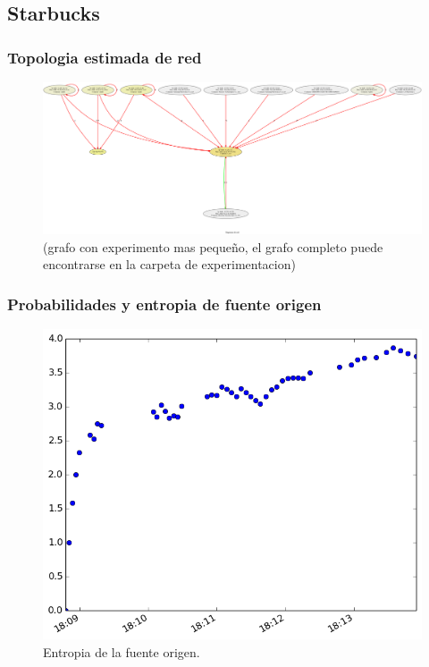 \subsection{Starbucks}
\subsubsection{Topologia estimada de red}
\begin{figure}[h!]
  \centering	
	\includegraphics[scale=0.15]{../experimentacion-svilerino/starbucks/graph-starbucks-3.png}
  \caption{(grafo con experimento mas pequeño, el grafo completo puede encontrarse en la carpeta de experimentacion)}
\end{figure}

\subsubsection{Probabilidades y entropia de fuente origen}
\begin{figure}[h!]
  \centering
	\includegraphics[scale=0.66]{../experimentacion-svilerino/starbucks/full-experiment-1/entropy_src.png}
  \caption{Entropia de la fuente origen.}
\end{figure}

